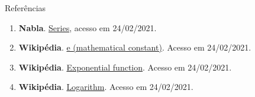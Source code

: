 \begin{frame}[fragile]{Referências}

    \begin{enumerate}
        \item \textbf{Nabla}. \href{http://www.nabla.hr/Z_MemoHU-089.htm}{Series}, acesso em 24/02/2021.

       \item \textbf{Wikipédia}. \href{https://en.wikipedia.org/wiki/E_(mathematical_constant)}{e (mathematical constant)}. Acesso em 24/02/2021.

       \item \textbf{Wikipédia}. \href{https://en.wikipedia.org/wiki/Exponential_function}{Exponential function}. Acesso em 24/02/2021.

       \item \textbf{Wikipédia}. \href{https://en.wikipedia.org/wiki/Logarithm}{Logarithm}. Acesso em 24/02/2021.
    \end{enumerate}

\end{frame}
